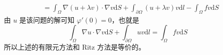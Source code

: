 \documentclass[a4paper]{article}
\begin{document}
\begin{enumerate}
\begin{equation}
\begin{aligned}
                    &= \int_{\Omega} \nabla (u + \lambda v) \cdot \nabla v \text{d}S
                        + \int_{\partial\Omega} (u + \lambda v)v \text{d}l
                        - \int_{\Omega} f v \text{d}S
                \end{aligned}
            \end{equation}
            由 $u$ 是该问题的解可知 $\varphi'(0) = 0$，也就是
            \begin{equation}
                \int_{\Omega} \nabla u \cdot \nabla v \text{d}S
                    + \int_{\partial\Omega} uv \text{d}l
                    = \int_{\Omega} f v \text{d}S
            \end{equation}
            所以上述的有限元方法和 Ritz 方法是等价的。
\end{enumerate}


\printbibliography
\end{document}
